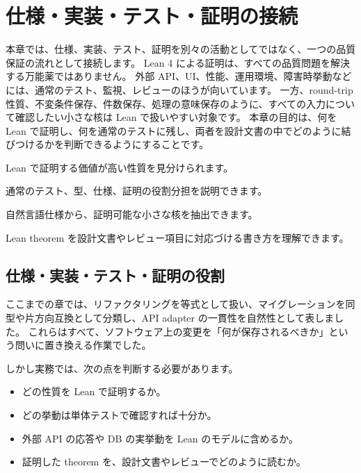 \chapter{仕様・実装・テスト・証明の接続}
\label{chap:spec-impl-test-proof}

\begin{chapterabstract}
本章では、仕様、実装、テスト、証明を別々の活動としてではなく、一つの品質保証の流れとして接続します。
Lean 4 による証明は、すべての品質問題を解決する万能薬ではありません。
外部 API、UI、性能、運用環境、障害時挙動などには、通常のテスト、監視、レビューのほうが向いています。
一方、round-trip 性質、不変条件保存、件数保存、処理の意味保存のように、すべての入力について確認したい小さな核は Lean で扱いやすい対象です。
本章の目的は、何を Lean で証明し、何を通常のテストに残し、両者を設計文書の中でどのように結びつけるかを判断できるようにすることです。
\end{chapterabstract}

\begin{learninggoals}
\item Lean で証明する価値が高い性質を見分けられます。
\item 通常のテスト、型、仕様、証明の役割分担を説明できます。
\item 自然言語仕様から、証明可能な小さな核を抽出できます。
\item Lean theorem を設計文書やレビュー項目に対応づける書き方を理解できます。
\end{learninggoals}

\section{仕様・実装・テスト・証明の役割}

ここまでの章では、リファクタリングを等式として扱い、マイグレーションを同型や片方向互換として分類し、API adapter の一貫性を自然性として表しました。
これらはすべて、ソフトウェア上の変更を「何が保存されるべきか」という問いに置き換える作業でした。

しかし実務では、次の点を判断する必要があります。

\begin{itemize}
\item どの性質を Lean で証明するか。
\item どの挙動は単体テストで確認すれば十分か。
\item 外部 API の応答や DB の実挙動を Lean のモデルに含めるか。
\item 証明した theorem を、設計文書やレビューでどのように読むか。
\end{itemize}

